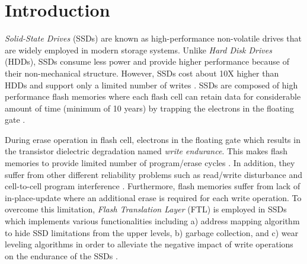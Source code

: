\vspace{-1em}
\section{Introduction}
\vspace{-0.6em}
\emph{Solid-State Drives} (SSDs) are known as high-performance non-volatile drives that are widely employed in modern storage systems. Unlike \emph{Hard Disk Drives} (HDDs), SSDs consume less power and provide higher performance because of their non-mechanical structure. However, SSDs cost about 10X higher than HDDs and support only a limited number of writes \cite{micheloni2012inside,salkhordeh2015operating,reca}. SSDs are composed of high performance flash memories where each flash cell 
can retain data for considerable amount of time (minimum of 10 years) by trapping the electrons in the floating gate \cite{cai2015data, bez2003introduction_flash}. 

During erase operation in flash cell, electrons  in the floating gate which results in the transistor dielectric degradation named \emph{write endurance}. This makes flash memories to provide limited number of program/erase cycles \cite{soundararajan2010extending, Boboila2010a}.
In addition, they suffer from other different reliability problems such as read/write disturbance and cell-to-cell program interference \cite{cai2017vulnerabilities}.
Furthermore, flash memories suffer from lack of in-place-update where an additional erase is required for each write operation. To overcome this limitation, \emph{Flash Translation Layer} (FTL) is employed in SSDs which implements various functionalities  including a) address mapping algorithm to hide SSD limitations from the upper levels, b) garbage collection, and c) wear leveling algorithms in order to alleviate the negative impact of write operations on the endurance of the SSDs \cite{chen2011caftl, gal2005algorithms_flash}.

